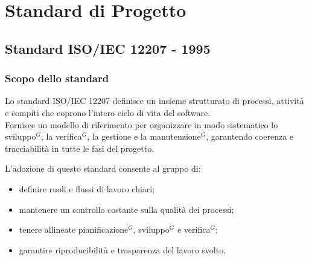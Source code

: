 \section{Standard di Progetto}

\subsection{Standard ISO/IEC 12207 - 1995}
\subsubsection{Scopo dello standard}
Lo standard ISO/IEC 12207 definisce un insieme strutturato di processi, attività e compiti che coprono l'intero ciclo di vita del software.\\
Fornisce un modello di riferimento per organizzare in modo sistematico lo sviluppo$^G$, la verifica$^G$, la gestione e la manutenzione$^G$, garantendo coerenza e tracciabilità in tutte le fasi del progetto.

L'adozione di questo standard consente al gruppo di:
\begin{itemize}
    \setlength\itemsep{-0.1em}
    \item definire ruoli e flussi di lavoro chiari;
    \item mantenere un controllo costante sulla qualità dei processi;
    \item tenere allineate pianificazione$^G$, sviluppo$^G$ e verifica$^G$;
    \item garantire riproducibilità e trasparenza del lavoro svolto.
\end{itemize}

